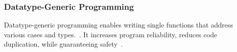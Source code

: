 



\begin{frame}\frametitle{Datatype-Generic Programming}
    
Datatype-generic programming enables writing single functions that address various cases and types.~\cite{derivable-type-classes}. 
It increases program reliability, reduces code duplication, while guaranteeing safety~\cite{datatype-generic-programming,optimizing-generics}.


\end{frame}